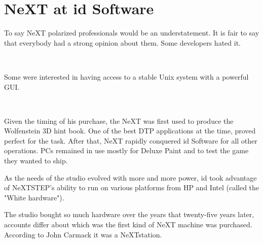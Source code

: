 \section{NeXT at id Software}
To say NeXT polarized professionals would be an understatement. It is fair to say that everybody had a strong opinion about them. Some developers hated it.\\
\par
{}\\
\par
Some were interested in having access to a stable Unix system with a powerful GUI.\\
\par
{}
\\
\par
Given the timing of his purchase, the NeXT was first used to produce the Wolfenstein 3D hint book. One of the best DTP applications at the time,  proved perfect for the task. After that, NeXT rapidly conquered id Software for all other operations. PCs remained in use mostly for Deluxe Paint and to test the game they wanted to ship.\\
\par
As the needs of the studio evolved with more and more power, id took advantage of NeXTSTEP's ability to run on various platforms from HP and Intel (called the "White hardware").






The studio bought so much hardware over the years that twenty-five years later, accounts differ about which was the first kind of NeXT machine was purchased. According to John Carmack it was a NeXTstation.\\
\par
\vspace{2mm}

